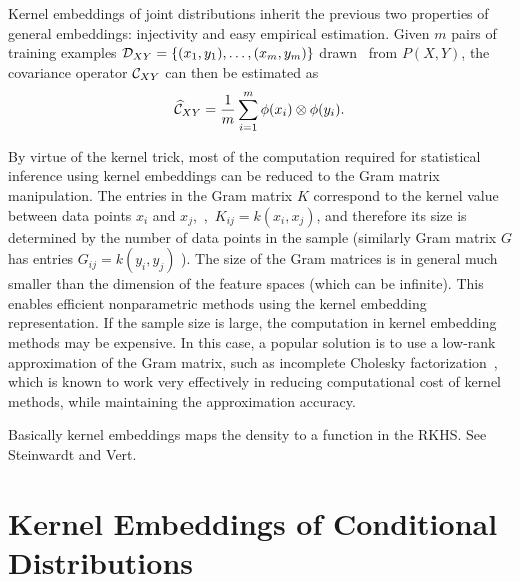 \documentclass[11pt]{article}
\newcommand{\hCcal}{\widehat{\Ccal}}
\begin{document}
Kernel embeddings of joint distributions inherit the previous two properties of general embeddings: injectivity and easy empirical estimation. Given $m$ pairs of training examples $\mathcal{D}_{XY}=\left\{(x_1,y_1),\ldots,(x_m,y_m)\right\}$ drawn \iid~from $P(X,Y)$,
the covariance operator $\mathcal{C}_{XY}$ can then be estimated as
\begin{align}
 \hCcal_{XY}=\frac{1}{m}\sum_{i=1}^m \phi(x_i) \otimes \phi(y_i). \label{eq:empirical_covariance}
\end{align}

By virtue of the kernel trick, most of the computation required for statistical inference using kernel embeddings can be reduced to the Gram matrix manipulation. The entries in the Gram matrix $K$ correspond to the kernel value between data points $x_i$ and $x_j$,~\ie,~$K_{ij} = k(x_i,x_j)$, and therefore its size is determined by the number of data points in the sample (similarly Gram matrix $G$ has entries $G_{ij}=k(y_i,y_j)$  ). The size of the Gram matrices is in general much smaller than the dimension of the feature spaces (which can be infinite). This enables efficient nonparametric methods using the kernel embedding representation. If the sample size is large, the computation in kernel embedding methods may be expensive. In this case, a popular solution is to use a low-rank approximation of the Gram matrix, such as incomplete Cholesky factorization~\cite{FinSch01}, which is known to work very effectively in reducing computational cost of kernel methods, while maintaining the approximation accuracy.

 Basically kernel embeddings maps the density to a function in the RKHS. See Steinwardt and Vert.

\section{Kernel Embeddings of Conditional Distributions}
\label{sec:conditionalembedding}
\end{document}
